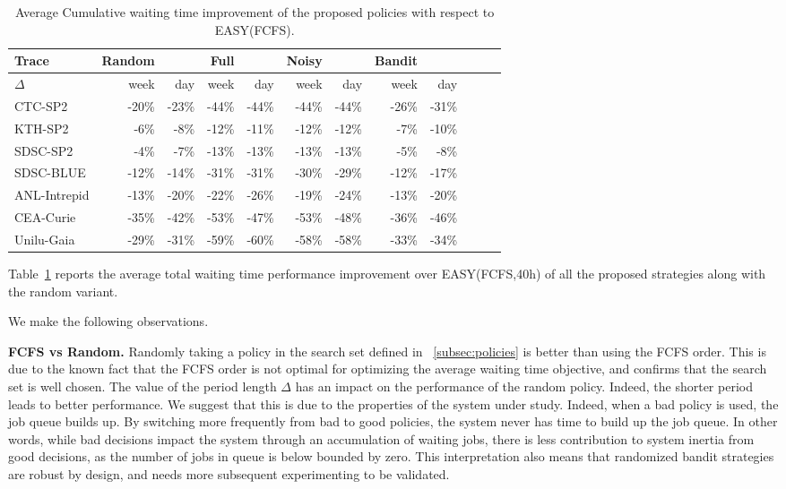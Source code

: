 \documentclass[sigconf,anonymous]{acmart}
\newcommand{\ra}[1]{\renewcommand{\arraystretch}{#1}}
\begin{document}
\begin{table}[]
  \centering
  \ra{1.3}
  \caption{Average Cumulative waiting time improvement of the proposed policies with respect to EASY(FCFS).}
  \label{tab:strat}
  \begin{tabular}{@{}lrrrrrrrrrrr@{}}
    \hline
    Trace        & Random &       & Full  &       & Noisy &       & Bandit & \\
    \hline
    $\Delta$     & week   & day   & week  & day   & week  & day   & week   & day \\
    CTC-SP2      & -20\%  & -23\% & -44\% & -44\% & -44\% & -44\% & -26\%  & -31\% \\
    KTH-SP2      & -6\%   & -8\%  & -12\% & -11\% & -12\% & -12\% & -7\%   & -10\% \\
    SDSC-SP2     & -4\%   & -7\%  & -13\% & -13\% & -13\% & -13\% & -5\%   & -8\% \\
    SDSC-BLUE    & -12\%  & -14\% & -31\% & -31\% & -30\% & -29\% & -12\%  & -17\% \\
    ANL-Intrepid & -13\%  & -20\% & -22\% & -26\% & -19\% & -24\% & -13\%  & -20\% \\
    CEA-Curie    & -35\%  & -42\% & -53\% & -47\% & -53\% & -48\% & -36\%  & -46\% \\
    Unilu-Gaia   & -29\%  & -31\% & -59\% & -60\% & -58\% & -58\% & -33\%  & -34\% \\
    \hline
  \end{tabular}
\end{table}

Table~\ref{tab:strat} reports the average total waiting time performance
improvement over EASY(FCFS,40h) of all the proposed strategies along with the
random variant.

We make the following observations.

\textbf{FCFS vs Random.} Randomly taking a policy in the search set defined in
~\ref{subsec:policies} is better than using the FCFS order. This is due to the
known fact that the FCFS order is not optimal for optimizing the average
waiting time objective, and confirms that the search set is well chosen.  The
value of the period length $\Delta$ has an impact on the performance of the
random policy. Indeed, the shorter period leads to better performance. We
suggest that this is due to the properties of the system under study. Indeed,
when a bad policy is used, the job queue builds up. By switching more
frequently from bad to good policies, the system never has time to build up the
job queue. In other words, while bad decisions impact the system through an
accumulation of waiting jobs, there is less contribution to system inertia from
good decisions, as the number of jobs in queue is below bounded by zero. This
interpretation also means that randomized bandit strategies are robust by
design, and needs more subsequent experimenting to be validated.
\end{document}
